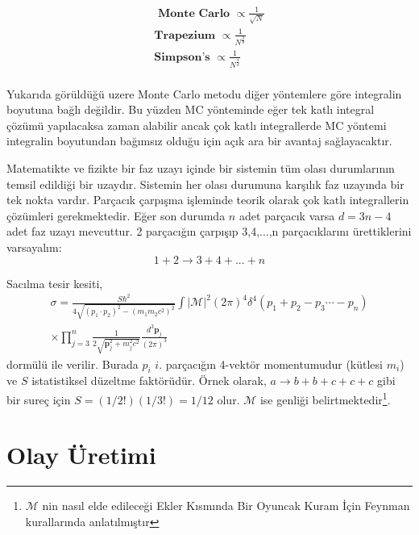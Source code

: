 \begin{equation}
\begin{aligned}
\textbf{ Monte Carlo } \varpropto \frac{1}{\sqrt{N}}\\
\textbf{Trapezium } \varpropto \frac{1}{N^{\frac{2}{d}}}\\
\textbf{Simpson's } \varpropto \frac{1}{N^{\frac{4}{d}}}\\
\end{aligned}
\end{equation}
\par Yukarıda görüldüğü uzere Monte Carlo metodu diğer yöntemlere göre integralin boyutuna bağlı değildir. Bu yüzden MC yönteminde eğer tek katlı integral çözümü yapılacaksa zaman alabilir ancak çok katlı integrallerde MC yöntemi integralin boyutundan bağımsız olduğu için açık ara bir avantaj sağlayacaktır.

\par Matematikte ve fizikte bir faz uzayı içinde bir sistemin tüm olası durumlarının temsil edildiği bir uzaydır. Sistemin her olası durumuna karşılık faz uzayında bir tek nokta vardır. Parçacık çarpışma işleminde teorik olarak çok katlı integrallerin çözümleri gerekmektedir. Eğer son durumda $n$ adet parçacık varsa $d=3 n - 4 $ adet faz uzayı mevcuttur. 2 parçacığın çarpışıp 3,4,...,n parçacıklarını ürettiklerini varsayalım:
\begin{equation}
1+2 \rightarrow 3 + 4 + ... + n
\end{equation}
\par Sacılma tesir kesiti,
\begin{equation}
\begin{aligned}
\sigma=  \frac{S \hbar^2}{4\sqrt{(p_1 \cdot p_2)^2 - (m_1 m_2 c^2)^2}}\int |\mathscr{M}|^2 (2 \pi)^4 \delta^4(p_1 + p_2 - p_3 \cdots - p_n) \\ \times \prod_{j=3}^n \frac{1}{2\sqrt{\textbf{p}_j^2+m_j^2c^2}}\frac{d^3 \textbf{p}_j}{(2\pi)^3} 
 \end{aligned}
\end{equation}
dormülü ile verilir. Burada $p_i$ $i$. parçacığın 4-vektör momentumudur (kütlesi $m_i$) ve $S$ istatistiksel düzeltme faktörüdür. Örnek olarak, $a \rightarrow b + b +c +c +c$ gibi bir sureç için $S= (1/2!)(1/3!)=1/12$ olur. $\mathscr{M}$ ise genliği belirtmektedir\footnote{$\mathscr{M}$ nin nasıl elde edileceği Ekler Kısmında Bir Oyuncak Kuram İçin Feynman kurallarında anlatılmıştır}.

\section{Olay Üretimi}
